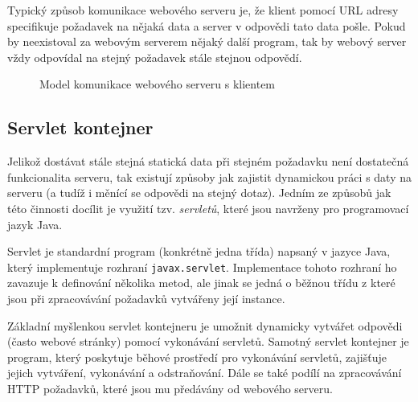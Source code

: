             Typický způsob komunikace webového serveru je, 
            že klient pomocí URL adresy specifikuje požadavek na nějaká
            data a server v odpovědi tato data pošle. Pokud by neexistoval za webovým serverem nějaký další
            program, tak by webový server vždy odpovídal na stejný požadavek stále stejnou odpovědí.

            \begin{figure}[ht]
                \begin{center}
                    \caption{Model komunikace webového serveru s klientem \cite{webserverVsServletPage}}
                    \label{imgWebserver}
                \end{center}
            \end{figure}

        \subsection{Servlet kontejner}
            Jelikož dostávat stále stejná statická data při stejném požadavku není dostatečná funkcionalita serveru,
            tak existují způsoby jak zajistit dynamickou práci s daty na serveru (a tudíž i měnící se odpovědi na stejný dotaz).
            Jedním ze způsobů jak této činnosti docílit je využití tzv. \emph{servletů},
            které jsou navrženy pro programovací jazyk Java.

            Servlet je standardní program (konkrétně jedna třída) napsaný v jazyce Java, 
            který implementuje rozhraní \texttt{javax.servlet}.
            Implementace tohoto rozhraní ho zavazuje k definování několika metod, ale jinak se jedná o běžnou
            třídu z které jsou při zpracovávání požadavků vytvářeny její instance.

            Základní myšlenkou servlet kontejneru je umožnit dynamicky vytvářet odpovědi (často webové stránky)
            pomocí vykonávání servletů. Samotný servlet kontejner je program, který poskytuje běhové prostředí pro vykonávání servletů,
            zajišťuje jejich vytváření, vykonávání a odstraňování. Dále se také podílí na zpracovávání HTTP požadavků, které jsou
            mu předávány od webového serveru. 

